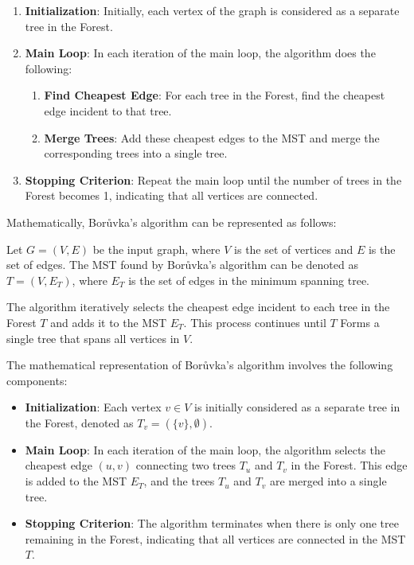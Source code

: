 \documentclass[12pt]{book} %
\begin{document}
\begin{enumerate}
    \item \textbf{Initialization}: Initially, each vertex of the graph is considered as a separate tree in the Forest.
    
    \item \textbf{Main Loop}: In each iteration of the main loop, the algorithm does the following:
        \begin{enumerate}
            \item \textbf{Find Cheapest Edge}: For each tree in the Forest, find the cheapest edge incident to that tree.
            \item \textbf{Merge Trees}: Add these cheapest edges to the MST and merge the corresponding trees into a single tree.
        \end{enumerate}
        
    \item \textbf{Stopping Criterion}: Repeat the main loop until the number of trees in the Forest becomes 1, indicating that all vertices are connected.
\end{enumerate}

Mathematically, Borůvka's algorithm can be represented as follows:

Let \( G = (V, E) \) be the input graph, where \( V \) is the set of vertices and \( E \) is the set of edges. The MST found by Borůvka's algorithm can be denoted as \( T = (V, E_T) \), where \( E_T \) is the set of edges in the minimum spanning tree.

The algorithm iteratively selects the cheapest edge incident to each tree in the Forest \( T \) and adds it to the MST \( E_T \). This process continues until \( T \) Forms a single tree that spans all vertices in \( V \).

The mathematical representation of Borůvka's algorithm involves the following components:

\begin{itemize}
    \item \textbf{Initialization}: Each vertex \( v \in V \) is initially considered as a separate tree in the Forest, denoted as \( T_v = (\{v\}, \emptyset) \).
    
    \item \textbf{Main Loop}: In each iteration of the main loop, the algorithm selects the cheapest edge \( (u, v) \) connecting two trees \( T_u \) and \( T_v \) in the Forest. This edge is added to the MST \( E_T \), and the trees \( T_u \) and \( T_v \) are merged into a single tree.
    
    \item \textbf{Stopping Criterion}: The algorithm terminates when there is only one tree remaining in the Forest, indicating that all vertices are connected in the MST \( T \).
\end{itemize}
\end{document}
